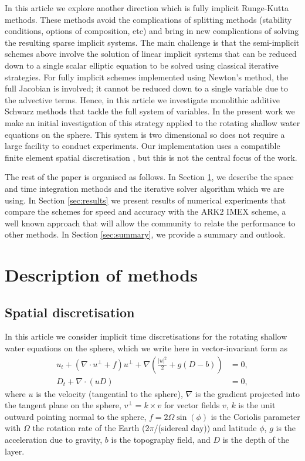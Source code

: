 \documentclass[a4paper, 12pt]{article}
\begin{document}
In this article we explore another direction which is fully implicit
Runge-Kutta methods. These methods avoid the complications of
splitting methods (stability conditions, options of composition, etc)
and bring in new complications of solving the resulting sparse
implicit systems. The main challenge is that the semi-implicit schemes
above involve the solution of linear implicit systems that can be
reduced down to a single scalar elliptic equation to be solved using
classical iterative strategies. For fully implicit schemes implemented
using Newton's method, the full Jacobian is involved; it cannot be
reduced down to a single variable due to the advective terms. Hence,
in this article we investigate monolithic additive Schwarz methods
that tackle the full system of variables. In the present work we make
an initial investigation of this strategy applied to the rotating
shallow water equations on the sphere. This system is two dimensional
so does not require a large facility to conduct experiments. Our
implementation uses a compatible finite element spatial discretisation
\citep{cotter2023compatible}, but this is not the central focus of the
work.

The rest of the paper is organised as follows. In Section \ref{sec:methods},
we describe the space and time integration methods and the iterative
solver algorithm which we are using. In Section \ref{sec:results} we
present results of numerical experiments that compare the schemes for
speed and accuracy with the ARK2 IMEX scheme, a well known approach that
will allow the community to relate the performance to other methods.
In Section \ref{sec:summary}, we provide a summary and outlook.

\section{Description of methods}
\label{sec:methods}
\subsection{Spatial discretisation}
In this article we consider implicit time discretisations for the
rotating shallow water equations on the sphere, which we write
here in vector-invariant form as
\begin{align}
  u_t + \left(\nabla\cdot u^\perp + f\right)u^\perp
  + \nabla\left(\frac{|u|^2}{2} + g(D-b)\right) & = 0, \\
  D_t + \nabla\cdot(uD) & = 0,
\end{align}
where $u$ is the velocity (tangential to the sphere), $\nabla$ is the
gradient projected into the tangent plane on the sphere, $v^\perp =
k\times v$ for vector fields $v$, $k$ is the unit outward pointing
normal to the sphere, $f=2\Omega \sin(\phi)$ is the Coriolis parameter
with $\Omega$ the rotation rate of the Earth (2$\pi$/(sidereal day))
and latitude $\phi$, $g$ is the acceleration due to gravity, $b$ is
the topography field, and $D$ is the depth of the layer.
\end{document}
